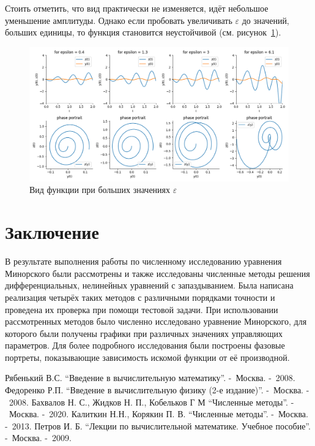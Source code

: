 \documentclass[a4paper,12pt]{article}
\begin{document}
	Стоить отметить, что вид практически не изменяется, идёт небольшое уменьшение амплитуды.
	Однако если пробовать увеличивать $\varepsilon$ до значений, больших единицы, 
	то функция становится неустойчивой (см. рисунок~\ref{fig:fig14}).

	\begin{figure}[ht!]
		\begin{center}
		\includegraphics[scale=0.48]{figures/eps2.png}
		\end{center}
		\vspace*{-8mm}
		\caption{Вид функции при больших значениях $\varepsilon$}\label{fig:fig14}
  	\end{figure}

	\section{Заключение}
	В результате выполнения работы по численному исследованию уравнения Минорского 
	были рассмотрены и также исследованы численные методы решения дифференциальных, 
	нелинейных уравнений с запаздыванием. Была написана реализация четырёх таких методов 
	с различными порядками точности и проведена их проверка при помощи тестовой задачи. 
	При использовании рассмотренных методов было численно исследовано уравнение 
	Минорского, для которого были получены графики при различных значениях 
	управляющих параметров. Для более подробного исследования были построены 
	фазовые портреты, показывающие зависимость искомой функции от её производной.


	\newpage
	
	\begin{thebibliography}{w:40}
		
		 Рябенький В.С. ``Введение в вычислительную 
		математику''. -~Москва. -~2008.
		 Федоренко Р.П. ``Введение в вычислительную физику 
		(2-е издание)''. -~Москва. -~2008.
		 Бахвалов Н. С., Жидков Н. П., Кобельков Г М
		``Численные методы''. -~Москва. -~2020.
		 Калиткин Н.Н., Корякин П. В. ``Численные методы''. 
		-~Москва. -~2013.
		 Петров И. Б. ``Лекции по вычислительной математике. 
		Учебное пособие''. -~Москва. -~2009.
		
	\end{thebibliography}
	
	
\end{document}
